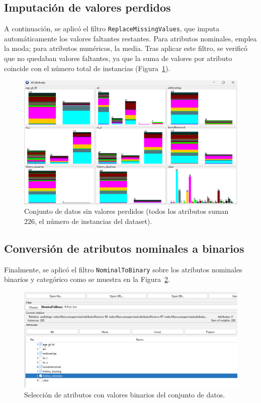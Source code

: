 \documentclass{article}
\begin{document}
\subsection{Imputación de valores perdidos}

A continuación, se aplicó el filtro \texttt{ReplaceMissingValues}, que imputa automáticamente los valores faltantes restantes. Para atributos nominales, emplea la moda; para atributos numéricos, la media. Tras aplicar este filtro, se verificó que no quedaban valores faltantes, ya que la suma de valores por atributo coincide con el número total de instancias (Figura~\ref{fig:no-missing}).

\begin{figure}[!ht]
    \centering
    \includegraphics[width=1\linewidth]{Imágenes/no-missing-values.png}
    \caption{Conjunto de datos sin valores perdidos (todos los atributos suman 226, el número de instancias del dataset).}
    \label{fig:no-missing}
\end{figure}

\subsection{Conversión de atributos nominales a binarios}

Finalmente, se aplicó el filtro \texttt{NominalToBinary} sobre los atributos nominales binarios y categórico como se muestra en la Figura~\ref{fig:binary_attr}. 

\begin{figure}[!ht]
    \centering
    \includegraphics[width=1\linewidth]{Imágenes/valores_binarios.png}
    \caption{Selección de atributos con valores binarios del conjunto de datos.}
    \label{fig:binary_attr}
\end{figure}
\end{document}
